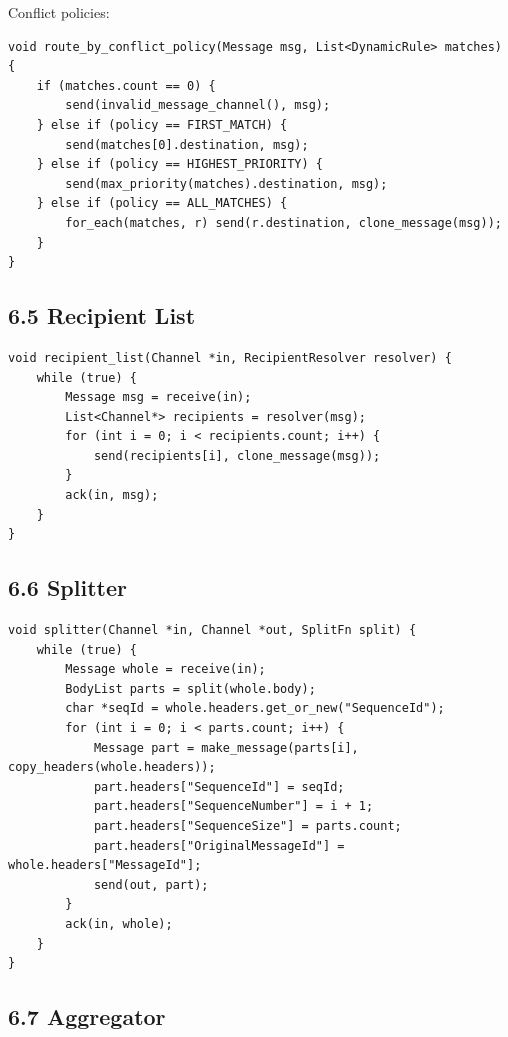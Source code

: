 \documentclass[11pt]{article}
\begin{document}
Conflict policies:

\begin{verbatim}
void route_by_conflict_policy(Message msg, List<DynamicRule> matches) {
    if (matches.count == 0) {
        send(invalid_message_channel(), msg);
    } else if (policy == FIRST_MATCH) {
        send(matches[0].destination, msg);
    } else if (policy == HIGHEST_PRIORITY) {
        send(max_priority(matches).destination, msg);
    } else if (policy == ALL_MATCHES) {
        for_each(matches, r) send(r.destination, clone_message(msg));
    }
}
\end{verbatim}

\subsection{6.5 Recipient List}\label{recipient-list}

\begin{verbatim}
void recipient_list(Channel *in, RecipientResolver resolver) {
    while (true) {
        Message msg = receive(in);
        List<Channel*> recipients = resolver(msg);
        for (int i = 0; i < recipients.count; i++) {
            send(recipients[i], clone_message(msg));
        }
        ack(in, msg);
    }
}
\end{verbatim}

\subsection{6.6 Splitter}\label{splitter}

\begin{verbatim}
void splitter(Channel *in, Channel *out, SplitFn split) {
    while (true) {
        Message whole = receive(in);
        BodyList parts = split(whole.body);
        char *seqId = whole.headers.get_or_new("SequenceId");
        for (int i = 0; i < parts.count; i++) {
            Message part = make_message(parts[i], copy_headers(whole.headers));
            part.headers["SequenceId"] = seqId;
            part.headers["SequenceNumber"] = i + 1;
            part.headers["SequenceSize"] = parts.count;
            part.headers["OriginalMessageId"] = whole.headers["MessageId"];
            send(out, part);
        }
        ack(in, whole);
    }
}
\end{verbatim}

\subsection{6.7 Aggregator}\label{aggregator}
\end{document}

